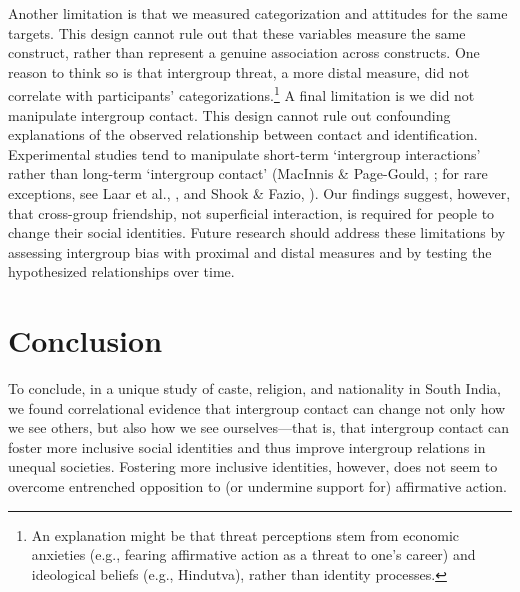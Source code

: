 \documentclass[12pt, a4paper]{article}
\begin{document}
Another limitation is that we measured categorization and attitudes for the same targets. This design cannot rule out that these variables measure the same construct, rather than represent a genuine association across constructs. One reason to think so is that intergroup threat, a more distal measure, did not correlate with participants’ categorizations.\footnote{An explanation might be that threat perceptions stem from economic anxieties (e.g., fearing affirmative action as a threat to one’s career) and ideological beliefs (e.g., Hindutva), rather than identity processes.} A final limitation is we did not manipulate intergroup contact. This design cannot rule out confounding explanations of the observed relationship between contact and identification. Experimental studies tend to manipulate short-term ‘intergroup interactions’ rather than long-term ‘intergroup contact’ (MacInnis \& Page-Gould, \cite*{macinnis_how_2015}; for rare exceptions, see Laar et al., \cite*{laar_effect_2005}, and Shook \& Fazio, \cite*{shook_interracial_2008}). Our findings suggest, however, that cross-group friendship, not superficial interaction, is required for people to change their social identities. Future research should address these limitations by assessing intergroup bias with proximal and distal measures and by testing the hypothesized relationships over time.

\section{Conclusion}

To conclude, in a unique study of caste, religion, and nationality in South India, we found correlational evidence that intergroup contact can change not only how we see others, but also how we see ourselves---that is, that intergroup contact can foster more inclusive social identities and thus improve intergroup relations in unequal societies. Fostering more inclusive identities, however, does not seem to overcome entrenched opposition to (or undermine support for) affirmative action.

\newpage

\printbibliography
\end{document}

